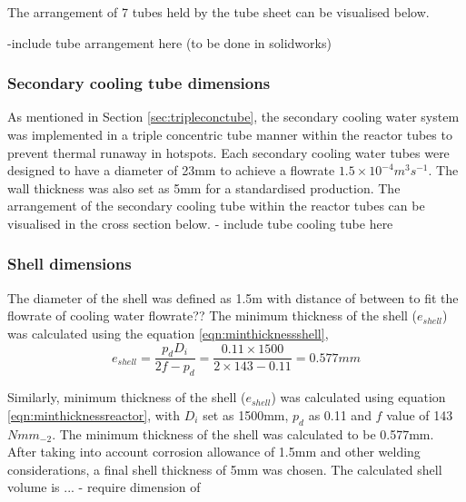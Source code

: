 The arrangement of 7 tubes held by the tube sheet can be visualised below.

-include tube arrangement here (to be done in solidworks)
\subsubsection{Secondary cooling tube dimensions}
As mentioned in Section \ref{sec:tripleconctube}, the secondary cooling water system was implemented in a triple concentric tube manner within the reactor tubes to prevent thermal runaway in hotspots. Each secondary cooling water tubes were designed to have a diameter of 23mm to achieve a flowrate $1.5 \times 10^{-4} m^3 s^{-1}$. The wall thickness was also set as 5mm for a standardised production. 
The arrangement of the secondary cooling tube within the reactor tubes can be visualised in the cross section below. 
- include tube cooling tube here

\subsubsection{Shell dimensions}
The diameter of the shell was defined as 1.5m with distance of between to fit the flowrate of cooling water flowrate??
The minimum thickness of the shell ($e_{shell}$) was calculated using the equation \ref{eqn:minthicknessshell},
\begin{equation}
    e_{shell} = \frac{p_dD_i}{2f-p_d} = \frac{0.11 \times 1500}{2 \times 143 - 0.11} = 0.577mm
    \label{eqn:minthicknessshell}
\end{equation}

Similarly, minimum thickness of the shell ($e_{shell}$) was calculated using equation \ref{eqn:minthicknessreactor}, with $D_i$ set as 1500mm, $p_d$ as 0.11 and $f$ value of 143$Nmm_{-2}$. The minimum thickness of the shell was calculated to be 0.577mm. After taking into account corrosion allowance of 1.5mm and other welding considerations, a final shell thickness of 5mm was chosen. 
The calculated shell volume is ...
- require dimension of 
